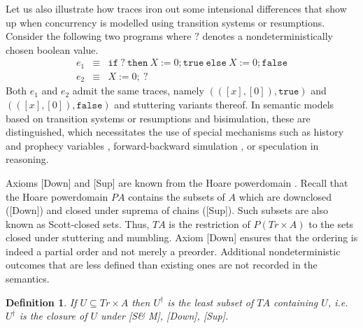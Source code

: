 \documentclass[nocopyrightspace,preprint]{sigplanconf}
\newcommand{\keywd}[1]{\mathtt{#1}}
\newcommand{\mnond}{\texttt{?}}
\newcommand{\mif}{\keywd{if}}
\newcommand{\mthen}{\keywd{then}}
\newcommand{\melse}{\keywd{else}}
\newcommand{\mtrue}{\keywd{true}}
\newcommand{\mfalse}{\keywd{false}}
\newcommand{\assign}[2]{{#1}:={#2}}
\newtheorem{definition}[theorem]{Definition}
\begin{document}
Let us also illustrate how traces iron out some intensional
differences that show up when concurrency is modelled using transition
systems or resumptions. Consider the following two programs where
$\mnond{}$ denotes a nondeterministically chosen boolean value.
\[
\begin{array}{lll}
e_1 &\equiv& \mif{~\mnond{}}\ \mthen\ \assign{X}{0};\mtrue\ \melse\ 
\assign{X}{0};\mfalse\\ 
e_2 &\equiv&\assign{X}{0};~\mnond{}
\end{array}
\]
Both $e_1$ and $e_2$ admit the same traces, namely
$(([x],[0]),\mtrue)$ and $(([x],[0]),\mfalse)$ and stuttering variants
thereof.  In semantic models based on transition systems or
resumptions and bisimulation, these are distinguished, which
necessitates the use of special mechanisms such as history and
prophecy variables \cite{DBLP:journals/tcs/AbadiL91}, forward-backward
simulation \cite{DBLP:dblp_journals/iandc/LynchV96}, or speculation
\cite{dreyer} in reasoning.


Axioms [Down] and [Sup] are known from the Hoare powerdomain
\cite{plotkin76siam}. Recall that the Hoare
powerdomain $PA$ contains the subsets of $A$ which are downclosed
([Down]) and closed under suprema of chains ([Sup]). Such subsets are
also known as Scott-closed sets.  Thus, $TA$ is the restriction of
$P(\textit{Tr}\times A)$ to the sets closed under stuttering and
mumbling. Axiom [Down] ensures that the ordering is indeed a partial
order and not merely a preorder. 
Additional nondeterministic outcomes that are less
defined than existing ones are not recorded in the semantics.

\begin{definition}
If $U\subseteq\textit{Tr}\times A$ then $U^\dagger$ is the
least subset of $TA$ containing $U$, i.e.\ $U^\dagger$ is the closure
of $U$ under [S\& M], [Down], [Sup].
\end{definition}
\end{document}
